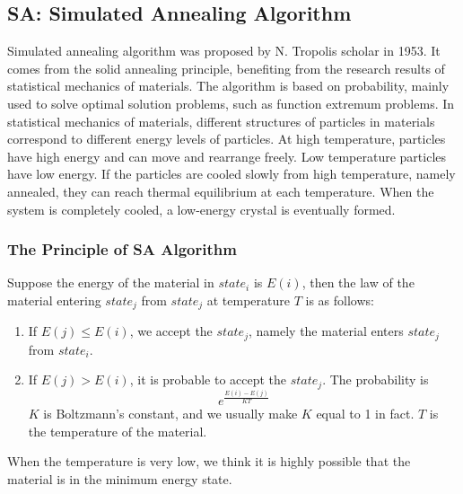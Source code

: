\documentclass{llncs}
\begin{document}
	\subsection{SA: Simulated Annealing Algorithm} \label{subsec-sa}
	Simulated annealing algorithm was proposed by N. Tropolis scholar in 1953. It comes from the solid annealing principle, benefiting from the research results of statistical mechanics of materials. The algorithm is based on probability,  mainly used to solve optimal solution problems, such as function extremum problems. In statistical mechanics of materials, different structures of particles in materials correspond to different energy levels of particles. At high temperature, particles have high energy and can move and rearrange freely. Low temperature particles have low energy. If the particles are cooled slowly from high temperature, namely annealed, they can reach thermal equilibrium at each temperature. When the system is completely cooled, a low-energy crystal is eventually formed.
	
	\subsubsection{The Principle of SA Algorithm} \label{subsubsec-principle}
	Suppose the energy of the material in $state_i$ is $E(i)$, then the law of the material entering $state_j$ from $state_j$ at temperature $T$ is as follows:
	\begin{enumerate}
		\item If $E(j) \leq E(i)$, we accept the $state_j$, namely the material enters $state_j$ from $state_i$.
		\item If $E(j) > E(i)$, it is probable to accept the $state_j$. The probability is
		\[
		e^\frac{E(i)-E(j)}{KT}
		\]
		$K$ is Boltzmann's constant, and we usually make $K$ equal to 1 in fact. $T$ is the temperature of the material.
	\end{enumerate}
	When the temperature is very low, we think it is highly possible that the material is in the minimum energy state. 
	
\end{document}
